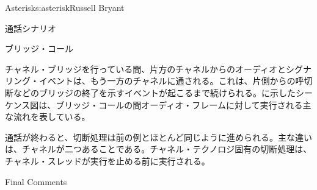 \begin{aosachapter}{Asterisk}{s:asterisk}{Russell Bryant}
\begin{aosasect1}{通話シナリオ}
\begin{aosasect2}{ブリッジ・コール}

チャネル・ブリッジを行っている間、片方のチャネルからのオーディオとシグナリング・イベントは、もう一方のチャネルに通される。これは、片側からの呼切断などのブリッジの終了を示すイベントが起こるまで続けられる。に示したシーケンス図は、ブリッジ・コールの間オーディオ・フレームに対して実行される主な流れを表している。


通話が終わると、切断処理は前の例とほとんど同じように進められる。主な違いは、チャネルが二つあることである。チャネル・テクノロジ固有の切断処理は、チャネル・スレッドが実行を止める前に実行される。

\end{aosasect2}

\end{aosasect1}

\begin{aosasect1}{Final Comments}


\end{aosasect1}
\end{aosachapter}
